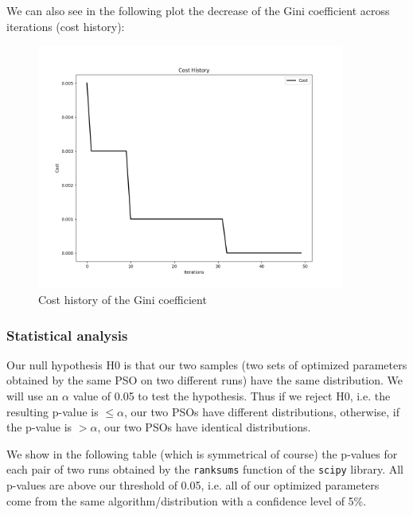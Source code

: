             We can also see in the following plot the decrease of the Gini coefficient across iterations (cost history):

            \begin{figure}[H]
                \centering
                \includegraphics[width=0.9\textwidth]{img/opti/costHistoryGini.png}
                \caption{Cost history of the Gini coefficient}
        \end{figure}

        \subsubsection{Statistical analysis}
        
            Our null hypothesis H0 is that our two samples (two sets of optimized parameters obtained by the same PSO on two different runs) have the same distribution. We will use an $\alpha$ value of 0.05 to test the hypothesis. Thus if we reject H0, i.e. the resulting p-value is $\leq \alpha$, our two PSOs have different distributions, otherwise, if the p-value is $> \alpha$, our two PSOs have identical distributions.

            We show in the following table (which is symmetrical of course) the p-values for each pair of two runs obtained by the \texttt{ranksums} function of the \texttt{scipy} library. All p-values are above our threshold of 0.05, i.e. all of our optimized parameters come from the same algorithm/distribution with a confidence level of 5\%.

